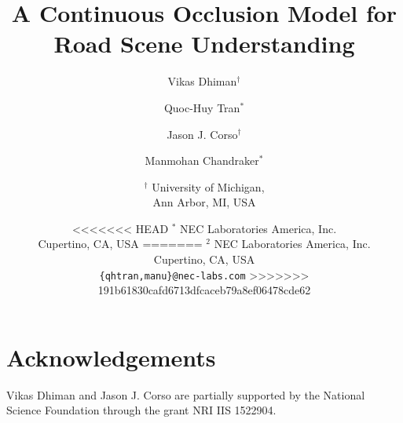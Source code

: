 \documentclass[10pt,twocolumn,letterpaper]{article}
\begin{document}
\title{A Continuous Occlusion Model for Road Scene Understanding}

\author{Vikas Dhiman$^\dagger$
\and
Quoc-Huy Tran$^*$
\and
Jason J. Corso$^\dagger$
\and
Manmohan Chandraker$^*$
\and
$^\dagger$ University of Michigan,\\
Ann Arbor, MI, USA
\and
<<<<<<< HEAD
$^*$ NEC Laboratories America, Inc.\\
Cupertino, CA, USA
=======
$^2$ NEC Laboratories America, Inc.\\
Cupertino, CA, USA\\
{\tt\small \{qhtran,manu\}@nec-labs.com}
>>>>>>> 191b61830cafd6713dfcaceb79a8ef06478cde62
}

\maketitle






%





\section*{Acknowledgements}
Vikas Dhiman and Jason J. Corso are partially supported by the National Science Foundation through the grant NRI IIS 1522904.





{\small


}
\end{document}

